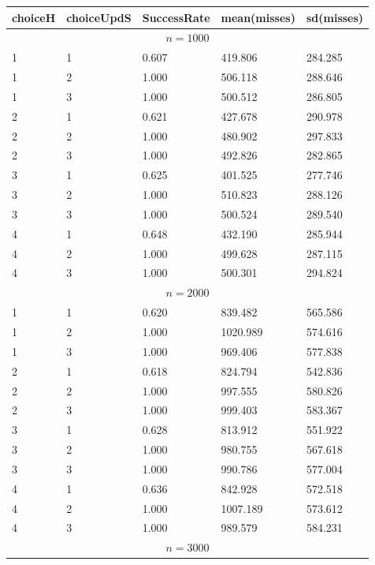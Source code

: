 \documentclass[11pt,a4paper,draft]{article}
\begin{document}
\begin{description}
	\begin{figure}[!h]
		\centering
		\begin{tabular}{lllll}
			\hline \hline 
			choiceH & choiceUpdS & SuccessRate & mean(misses) & sd(misses) \\
			\hline \hline 
			\multicolumn{5}{c}{$n = 1000$} \\ 
			\hline 
			1 & 1 &  0.607 & 419.806 & 284.285 \\
			1 & 2 &  1.000 & 506.118 & 288.646 \\
			1 & 3 &  1.000 & 500.512 & 286.805 \\
			\hline 
			2 & 1 &  0.621 & 427.678 & 290.978 \\
			2 & 2 &  1.000 & 480.902 & 297.833 \\
			2 & 3 &  1.000 & 492.826 & 282.865 \\
			\hline 
			3 & 1 &  0.625 & 401.525 & 277.746 \\
			3 & 2 &  1.000 & 510.823 & 288.126 \\
			3 & 3 &  1.000 & 500.524 & 289.540 \\
			\hline 
			4 & 1 &  0.648 & 432.190 & 285.944 \\
			4 & 2 &  1.000 & 499.628 & 287.115 \\
			4 & 3 &  1.000 & 500.301 & 294.824 \\
			\hline 
			\hline 
			\multicolumn{5}{c}{$n = 2000$} \\ 
			\hline 
			1 & 1 &  0.620 & 839.482 & 565.586 \\
			1 & 2 &  1.000 & 1020.989 & 574.616 \\
			1 & 3 &  1.000 & 969.406 & 577.838 \\
			\hline 
			2 & 1 &  0.618 & 824.794 & 542.836 \\
			2 & 2 &  1.000 & 997.555 & 580.826 \\
			2 & 3 &  1.000 & 999.403 & 583.367 \\
			\hline 
			3 & 1 &  0.628 & 813.912 & 551.922 \\
			3 & 2 &  1.000 & 980.755 & 567.618 \\
			3 & 3 &  1.000 & 990.786 & 577.004 \\
			\hline 
			4 & 1 &  0.636 & 842.928 & 572.518 \\
			4 & 2 &  1.000 & 1007.189 & 573.612 \\
			4 & 3 &  1.000 & 989.579 & 584.231 \\
			\hline 
			\hline 
			\multicolumn{5}{c}{$n = 3000$} \\ 
			\hline 

\end{tabular}
\end{figure}
\end{description}
\end{document}
